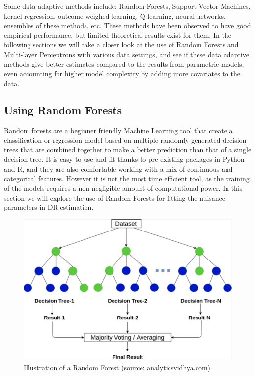 \documentclass[12pt,twoside]{article}
\begin{document}
Some data adaptive methods include: Random Forests, Support Vector Machines, kernel regression, outcome weighed learning, Q-learning, neural networks, ensembles of these methods, etc. These methods have been observed to have good empirical performance, but limited theoretical results exist for them. In the following sections we will take a closer look at the use of Random Forests and Multi-layer Perceptrons  with various data settings, and see if these data adaptive methods give better estimates compared to the results from parametric models, even accounting for higher model complexity by adding more covariates to the data.

\subsection{Using Random Forests}

Random forests are a beginner friendly Machine Learning tool that create a classification or regression model based on multiple randomly generated decision trees that are combined together to make a better prediction than that of a single decision tree. It is easy to use and fit thanks to pre-existing packages in Python and R, and they are also comfortable working with a mix of continuous and categorical features. However it is not the most time efficient tool, as the training of the models requires a non-negligible amount of computational power. In this section we will explore the use of Random Forests for fitting the nuisance parameters in DR estimation.

\begin{figure}
    \centering
    \includegraphics[width = 0.7\columnwidth]{figures/tree.png}
    \caption{Illustration of a Random Forest (source: analyticsvidhya.com)}
    \label{fig:my_label}
\end{figure}
\end{document}
